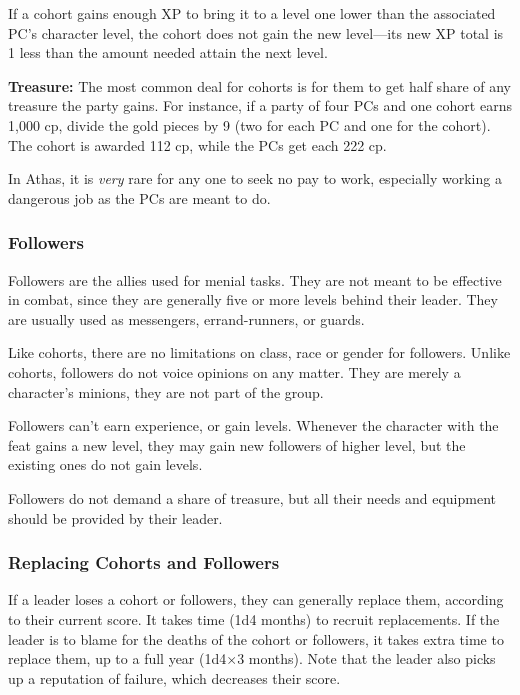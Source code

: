 If a cohort gains enough XP to bring it to a level one lower than the associated PC's character level, the cohort does not gain the new level---its new XP total is 1 less than the amount needed attain the next level.

\textbf{Treasure:} The most common deal for cohorts is for them to get half share of any treasure the party gains. For instance, if a party of four PCs and one cohort earns 1,000 cp, divide the gold pieces by 9 (two for each PC and one for the cohort). The cohort is awarded 112 cp, while the PCs get each 222 cp.

In Athas, it is \emph{very} rare for any one to seek no pay to work, especially working a dangerous job as the PCs are meant to do.

\subsubsection{Followers}
Followers are the allies used for menial tasks. They are not meant to be effective in combat, since they are generally five or more levels behind their leader. They are usually used as messengers, errand-runners, or guards.

Like cohorts, there are no limitations on class, race or gender for followers. Unlike cohorts, followers do not voice opinions on any matter. They are merely a character's minions, they are not part of the group.

Followers can't earn experience, or gain levels. Whenever the character with the  feat gains a new level, they may gain new followers of higher level, but the existing ones do not gain levels.

Followers do not demand a share of treasure, but all their needs and equipment should be provided by their leader.

\subsubsection{Replacing Cohorts and Followers}
If a leader loses a cohort or followers, they can generally replace them, according to their current  score. It takes time (1d4 months) to recruit replacements. If the leader is to blame for the deaths of the cohort or followers, it takes extra time to replace them, up to a full year (1d4$\times$3 months). Note that the leader also picks up a reputation of failure, which decreases their  score.
